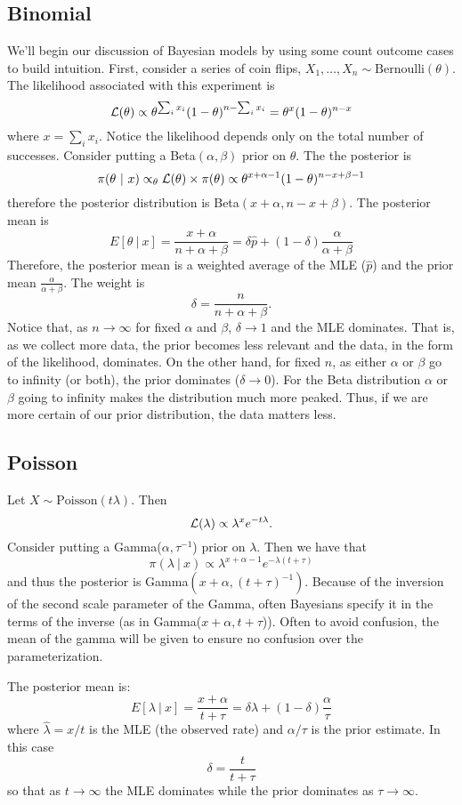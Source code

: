 \subsection{Binomial}
We'll begin our discussion of Bayesian models by using some count outcome cases to build 
intuition. First, consider a series of coin flips, $X_1, \ldots, X_n \sim \mbox{Bernoulli}(\theta)$.
The likelihood associated with this experiment is
$$
{\cal L}(\theta) \propto \theta^{\sum_i x_i} (1 - \theta)^{n-\sum_i x_i} = \theta^x (1 - \theta)^{n-x}
$$
where $x = \sum_i x_i$. Notice the likelihood depends only on the total number of successes.
Consider putting a Beta$(\alpha, \beta)$ prior on $\theta$. The the posterior is 
$$
\pi(\theta ~|~ x) \propto_\theta {\cal L}(\theta) \times \pi(\theta) \propto \theta^{x + \alpha - 1} (1 - \theta)^{n - x + \beta - 1}
$$
therefore the posterior distribution is Beta$(x + \alpha, n - x + \beta)$. The posterior mean is
$$
E[\theta ~|~ x] = \frac{x + \alpha}{n + \alpha + \beta} 
= \delta \hat p + (1 - \delta) \frac{\alpha}{\alpha + \beta}
$$
Therefore, the posterior mean is a weighted average of the MLE ($\hat p$) and the prior
mean $\frac{\alpha}{\alpha + \beta}$. The weight is 
$$
\delta = \frac{n}{n + \alpha + \beta}.
$$
Notice that, as $n \rightarrow \infty$ for fixed $\alpha$ and $\beta$, $\delta \rightarrow 1$ and
the MLE
dominates. That is, as we collect more data, the prior becomes less relevant
and the data, in the form of the likelihood, dominates. On the other hand,
for fixed $n$, as either $\alpha$ or $\beta$ go to infinity (or both), the prior
dominates ($\delta \rightarrow 0$). For the Beta distribution $\alpha$ or $\beta$ going to infinity makes
the distribution much more peaked. Thus, if we are more certain of our prior
distribution, the data matters less. 


\subsection{Poisson}
Let $X \sim \mbox{Poisson}(t\lambda)$. Then 
$$
{\cal L}(\lambda) \propto \lambda^x e^{-t \lambda}.
$$
Consider putting a Gamma($\alpha, \tau^{-1}$) prior on $\lambda$. Then
we have that
$$
\pi(\lambda ~|~ x) \propto \lambda^{x + \alpha - 1} e^{-\lambda (t + \tau)} 
$$
and thus the posterior is Gamma$(x + \alpha, (t + \tau)^{-1})$. Because of
the inversion of the second scale parameter of the Gamma, often Bayesians
specify it in the terms of the inverse (as in Gamma($x + \alpha, t + \tau$)). 
Often to avoid confusion, the mean of the gamma will be given to ensure no
confusion over the parameterization.

The posterior mean is:
$$
E[ \lambda ~|~ x]  = \frac{x + \alpha}{t + \tau}
= \delta \hat \lambda + (1 - \delta) \frac{\alpha}{\tau}
$$
where $\hat \lambda = x / t$ is the MLE (the observed rate) and
$\alpha / \tau$ is the prior estimate. In this case 
$$
\delta = \frac{t}{t + \tau}
$$
so that as $t \rightarrow \infty$ the MLE dominates while the prior
dominates as $\tau \rightarrow \infty$. 


